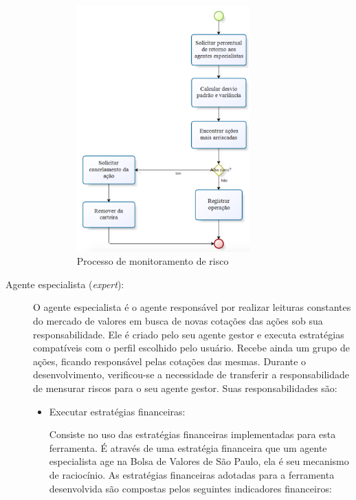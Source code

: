 \begin{description}
\begin{itemize}
\begin{figure}[h!]
\centering
\label{f24}
\includegraphics[width=0.7\textwidth]{figuras/f15}
\caption{Processo de monitoramento de risco}
\end{figure}
\FloatBarrier

\end{itemize}

\item[Agente especialista (\textit{expert}):]
O agente especialista é o agente responsável por realizar leituras constantes do mercado de valores em busca de novas cotações das ações sob sua responsabilidade. Ele é criado pelo seu agente gestor e executa estratégias compatíveis com o perfil escolhido pelo usuário. Recebe ainda um grupo de ações, ficando responsável pelas cotações das mesmas. Durante o desenvolvimento, verificou-se a necessidade de transferir a responsabilidade de mensurar riscos para o seu agente gestor. Suas responsabilidades são:

\begin{itemize}
\item Executar estratégias financeiras:\newline

Consiste no uso das estratégias financeiras implementadas para esta ferramenta. É através de uma estratégia financeira que um agente especialista age na Bolsa de Valores de São Paulo, ela é seu mecanismo de raciocínio. As estratégias financeiras adotadas para a ferramenta desenvolvida são compostas pelos seguintes indicadores financeiros: 


\end{itemize}
\end{description}
